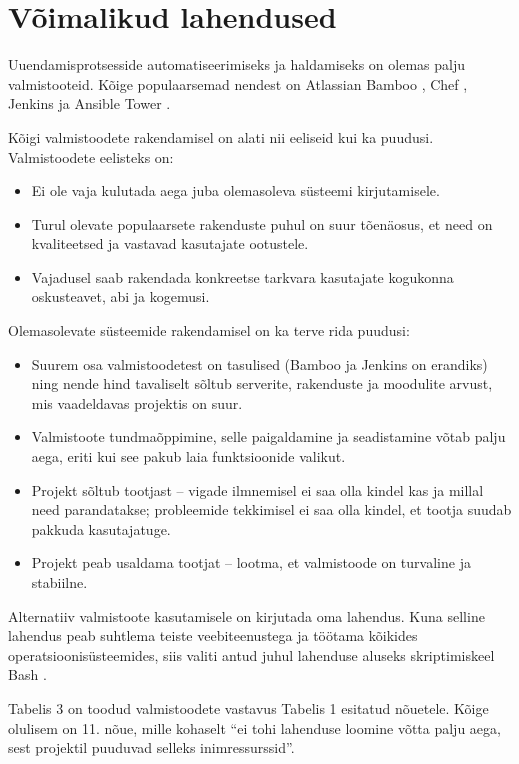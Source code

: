 \documentclass[12pt]{article}
\begin{document}
  \newpage
  
  \section{Võimalikud lahendused}
  
  Uuendamisprotsesside automatiseerimiseks ja haldamiseks on olemas palju valmistooteid. Kõige populaarsemad nendest on Atlassian Bamboo \cite{bamboo}, Chef \cite{chef}, Jenkins \cite{jenkins} ja Ansible Tower \cite{ansible}.
  
  Kõigi valmistoodete rakendamisel on alati nii eeliseid kui ka puudusi. Valmistoodete eelisteks on:
  \begin{itemize}
    \item Ei ole vaja kulutada aega juba olemasoleva süsteemi kirjutamisele.
    \item Turul olevate populaarsete rakenduste puhul on suur tõenäosus, et need on kvaliteetsed ja vastavad kasutajate ootustele.
    \item Vajadusel saab rakendada konkreetse tarkvara kasutajate kogukonna oskusteavet, abi ja kogemusi.
  \end{itemize}
  
  Olemasolevate süsteemide rakendamisel on ka terve rida puudusi:
  \begin{itemize}
    \item Suurem osa valmistoodetest on tasulised (Bamboo ja Jenkins on erandiks) ning nende hind tavaliselt sõltub serverite, rakenduste ja moodulite arvust, mis vaadeldavas projektis on suur.
    \item Valmistoote tundmaõppimine, selle paigaldamine ja seadistamine võtab palju aega, eriti kui see pakub laia funktsioonide valikut.
    \item Projekt sõltub tootjast \--- vigade ilmnemisel ei saa olla kindel kas ja millal need parandatakse; probleemide tekkimisel ei saa olla kindel, et tootja suudab pakkuda kasutajatuge.
    \item Projekt peab usaldama tootjat \--- lootma, et valmistoode on turvaline ja stabiilne.
  \end{itemize}
    
  Alternatiiv valmistoote kasutamisele on kirjutada oma lahendus. Kuna selline lahendus peab suhtlema teiste veebiteenustega ja töötama kõikides operatsioonisüsteemides, siis valiti antud juhul lahenduse aluseks skriptimiskeel Bash \cite{bash,bash-book}.
  
  Tabelis 3 on toodud valmistoodete vastavus Tabelis 1 esitatud nõuetele. Kõige olulisem on 11. nõue, mille kohaselt ``ei tohi lahenduse loomine võtta palju aega, sest projektil puuduvad selleks inimressurssid''.
  
\end{document}
